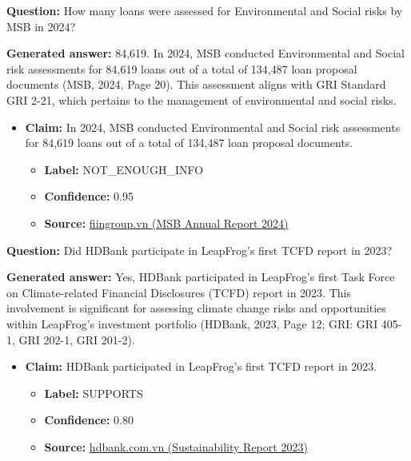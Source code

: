 \documentclass[sn-mathphys, oneside]{sn-jnl}
\begin{document}
\begin{tcolorbox}[colback=white,colframe=black!65,boxrule=0.6pt,arc=0pt,left=8pt,right=8pt,top=8pt,bottom=8pt]

\textbf{Question:} How many loans were assessed for Environmental and Social risks by MSB in 2024?

\textbf{Generated answer:} 84,619. In 2024, MSB conducted Environmental and Social risk assessments for 84,619 loans out of a total of 134,487 loan proposal documents (MSB, 2024, Page 20). This assessment aligns with GRI Standard GRI 2-21, which pertains to the management of environmental and social risks.

\begin{itemize}
    \item \textbf{Claim:} In 2024, MSB conducted Environmental and Social risk assessments for 84,619 loans out of a total of 134,487 loan proposal documents.
    \begin{itemize}
        \item \textbf{Label:} NOT\_ENOUGH\_INFO
        \item \textbf{Confidence:} 0.95
        \item \textbf{Source:} \href{https://cmsv5.fiingroup.vn/medialib/FG/2025/2025-04/2025-04-22/20250422_MSB-250422-Annual-Report-2024.pdf}{fiingroup.vn (MSB Annual Report 2024)}
    \end{itemize}
\end{itemize}

\end{tcolorbox}


\begin{tcolorbox}[colback=white,colframe=black!65,boxrule=0.6pt,arc=0pt,left=8pt,right=8pt,top=8pt,bottom=8pt]

\textbf{Question:} Did HDBank participate in LeapFrog's first TCFD report in 2023?

\textbf{Generated answer:} Yes, HDBank participated in LeapFrog's first Task Force on Climate-related Financial Disclosures (TCFD) report in 2023. This involvement is significant for assessing climate change risks and opportunities within LeapFrog's investment portfolio (HDBank, 2023, Page 12; GRI: GRI 405-1, GRI 202-1, GRI 201-2).

\begin{itemize}
    \item \textbf{Claim:} HDBank participated in LeapFrog's first TCFD report in 2023.
    \begin{itemize}
        \item \textbf{Label:} SUPPORTS
        \item \textbf{Confidence:} 0.80
        \item \textbf{Source:} \href{https://cdn.hdbank.com.vn/hdbank-file/investor/src/bctn-2023/phat-trien-ben-vung-EN.html}{hdbank.com.vn (Sustainability Report 2023)}
    \end{itemize}
\end{itemize}

\end{tcolorbox}
\end{document}
